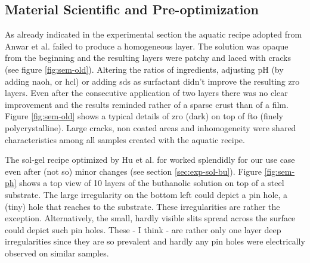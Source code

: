 \subsection{Material Scientific and Pre-optimization}
\label{sec:res-mat}
As already indicated in the experimental section the aquatic recipe adopted from Anwar et al.\cite{Anwar2017} failed to produce a homogeneous layer. 
The solution was opaque from the beginning and the resulting layers were patchy and laced with cracks (see figure \ref{fig:sem-old}). 
Altering the ratios of ingredients, adjusting pH (by adding \gls{naoh},  or \gls{hcl}) or adding \gls{sds} as surfactant didn't improve the resulting \gls{zro} layers. 
Even after the consecutive application of two layers there was no clear improvement and the results reminded rather of a sparse crust than of a film. 
%
Figure \ref{fig:sem-old} shows a typical details of \gls{zro} (dark) on top of \gls{fto} (finely polycrystalline). 
Large cracks, non coated areas and inhomogeneity were 
shared characteristics among 
all samples created with the aquatic recipe. 

The sol-gel recipe optimized by Hu et al.\cite{Hu2016} for  worked splendidly for our use case even after (not so) minor changes (see section \ref{sec:exp-sol-bu}). 
%
Figure \ref{fig:sem-ph} shows a top view of 10 layers of the buthanolic solution on top of a steel substrate. 
The large irregularity on the bottom left could depict a pin hole, a (tiny) hole that reaches to the substrate. 
These irregularities are rather the exception. 
Alternatively, the small, hardly visible slits spread across the surface could depict such pin holes. 
These - I think - are rather only one layer deep irregularities since they are so prevalent
and hardly any pin holes were electrically observed on similar samples. 


